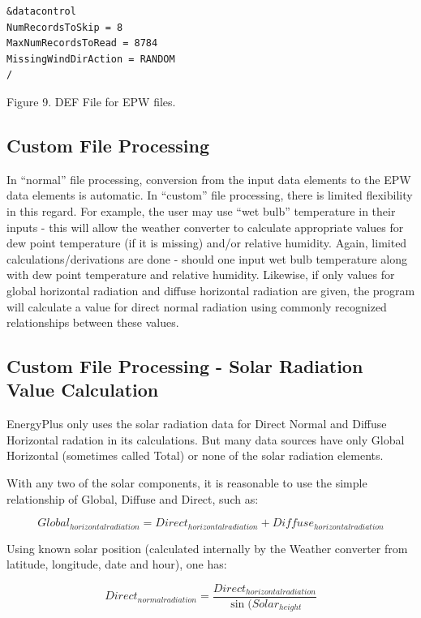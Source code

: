 \begin{lstlisting}
&datacontrol
NumRecordsToSkip = 8
MaxNumRecordsToRead = 8784
MissingWindDirAction = RANDOM
/
\end{lstlisting}

Figure 9. DEF File for EPW files.

\subsection{Custom File Processing}\label{custom-file-processing}

In ``normal'' file processing, conversion from the input data elements to the EPW data elements is automatic. In ``custom'' file processing, there is limited flexibility in this regard. For example, the user may use ``wet bulb'' temperature in their inputs - this will allow the weather converter to calculate appropriate values for dew point temperature (if it is missing) and/or relative humidity. Again, limited calculations/derivations are done - should one input wet bulb temperature along with dew point temperature and relative humidity. Likewise, if only values for global horizontal radiation and diffuse horizontal radiation are given, the program will calculate a value for direct normal radiation using commonly recognized relationships between these values.

\subsection{Custom File Processing - Solar Radiation Value Calculation}\label{custom-file-processing---solar-radiation-value-calculation}

EnergyPlus only uses the solar radiation data for Direct Normal and Diffuse Horizontal radation in its calculations. But many data sources have only Global Horizontal (sometimes called Total) or none of the solar radiation elements.

With any two of the solar components, it is reasonable to use the simple relationship of Global, Diffuse and Direct, such as:

\begin{equation}
Global_{horizontalradiation} = Direct_{horizontalradiation}+Diffuse_{horizontalradiation}
\end{equation}

Using known solar position (calculated internally by the Weather converter from latitude, longitude, date and hour), one has:

\begin{equation}
Direct_{normalradiation} = \frac{Direct_{horizontalradiation}}{\sin(Solar_{height}}
\end{equation}

